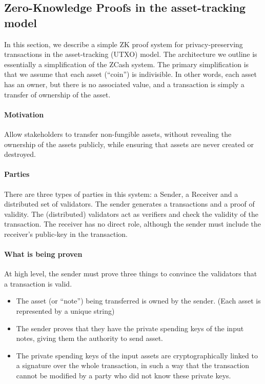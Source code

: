 \subsection{Zero-Knowledge Proofs in the asset-tracking model}
\label{apps:asset-transfer:zkps-asset-tracking-model}

In this section, we describe a simple ZK proof system for privacy-preserving transactions in the asset-tracking (UTXO) model.  The architecture we outline is essentially a simplification of the ZCash system.  The primary simplification is that we assume that each asset (``coin'') is indivisible.  In other words, each asset has an owner, but there is no associated value, and a transaction is simply a transfer of ownership of the asset.

\paragraph[:]{Motivation} Allow stakeholders to transfer non-fungible assets, without revealing the ownership of the assets publicly, while ensuring that assets are never created or destroyed.


\paragraph[:]{Parties} There are three types of parties in this system: a Sender, a Receiver and a distributed set of validators.  The sender generates a transactions and a proof of validity.  The (distributed) validators act as verifiers and check the validity of the transaction.  The receiver has no direct role, although the sender must include the receiver's public-key in the transaction.


\paragraph[:]{What is being proven} At high level, the sender must prove three things to convince the validators that a transaction is valid.
\begin{itemize}
 \item The asset (or ``note'') being transferred is owned by the sender.  (Each asset is represented by a unique string)
 \item The sender proves that they have the private spending keys of the input notes, giving them the authority to send asset.
 \item The private spending keys of the input assets are cryptographically linked to a signature over the whole transaction, in such a way that the transaction cannot be modified by a party who did not know these private keys.
\end{itemize}


